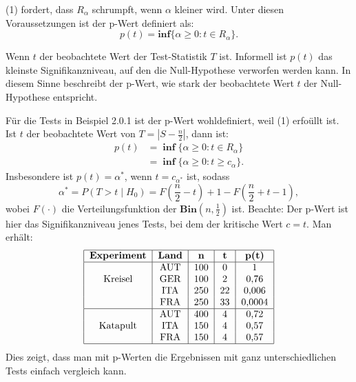 \documentclass[10pt]{article}
\newenvironment{BSP}[1][]
{\begin{Beispiel}[frametitle=#1]}{\end{Beispiel}}
\begin{document}
	\begin{Definition}
		(1) fordert, dass $R_\alpha$ schrumpft, wenn $\alpha$ kleiner wird. Unter diesen Voraussetzungen ist der p-Wert definiert als:
		\begin{equation*}
			p(t) = \textbf{inf} \{\alpha \geq 0 : t \in R_\alpha\}. 
		\end{equation*}
	\end{Definition}
	Wenn $t$ der beobachtete Wert der Test-Statistik $T$ ist. Informell ist $p(t)$ das kleinste Signifikanzniveau, auf den die Null-Hypothese verworfen werden kann. In diesem Sinne beschreibt der p-Wert, wie stark der beobachtete Wert $t$ der Null-Hypothese entspricht. 

	\begin{BSP}[Beispiel 2.0.2 (p-Wert)]
		Für die Tests in Beispiel 2.0.1 ist der p-Wert wohldefiniert, weil (1) erfoüllt ist.
		Ist $t$ der beobachtete Wert von $T = \left\vert S - \frac{n}{2} \right\vert$, dann ist:
		\begin{equation*}
			\begin{split}
				p(t) &= \; \textbf{inf} \; \{\alpha \geq 0: t \in R_\alpha\}\\
				&= \; \textbf{inf} \; \{\alpha \geq 0 : t \geq c_\alpha \}.
			\end{split}
		\end{equation*}
		Insbesondere ist $p(t) = \alpha^*$, wenn $t = c_{\alpha^*}$ ist, sodass
		\begin{equation*}
			\alpha^* = P(T > t \mid H_0) = F\left(\frac{n}{2} - t \right) + 1 - F\left(\frac{n}{2} + t -1\right),
		\end{equation*}
		wobei $F(\cdot)$ die Verteilungsfunktion der $\textbf{Bin}\left(n, \frac{1}{2} \right) $ ist.
		Beachte: Der p-Wert ist hier das Signifikanzniveau jenes Tests, bei dem der kritische Wert $c = t$. 
		Man erhält:
			\begin{align*}
			\begin{tabular}{|c|c|c|c|c|c|}
				\hline
				\textbf{Experiment} & \textbf{Land} & \textbf{n} & \textbf{t} & \textbf{p(t)}\\
				\hline
				& AUT & 100 & 0 & 1\\
				Kreisel & GER & 100 & 2 & 0,76\\
				& ITA & 250 & 22 & 0,006\\
				& FRA & 250 & 33 & 0,0004\\
				\hline
				& AUT & 400 & 4 & 0,72\\
				Katapult & ITA & 150 & 4 & 0,57\\
				& FRA & 150 & 4 & 0,57\\
				\hline
			\end{tabular}
		\end{align*}
		Dies zeigt, dass man mit p-Werten die Ergebnissen mit ganz unterschiedlichen Tests einfach vergleich kann. 
	\end{BSP}	
	
\end{document}
